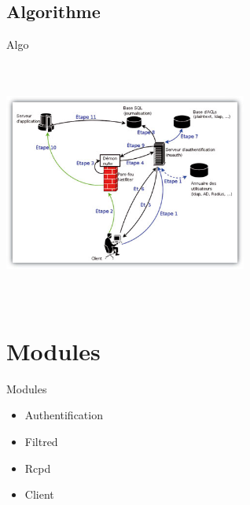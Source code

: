 \documentclass[t,12pt]{beamer}
\begin{document}
  \subsection{Algorithme}
    \begin{frame}{Algo}
	    \begin{center}\includegraphics[width=8cm,height=8cm]{images/algo.jpg}\end{center}
    \end{frame}                                                      


\section{Modules}                                                   
\begin{frame}{Modules}
    \begin{itemize}                                                 
	\item Authentification
	\newline
	\item Filtred
	\newline
	\item Rcpd
	\newline
	\item Client
\end{itemize}
\end{frame}                                                         
\end{document}
